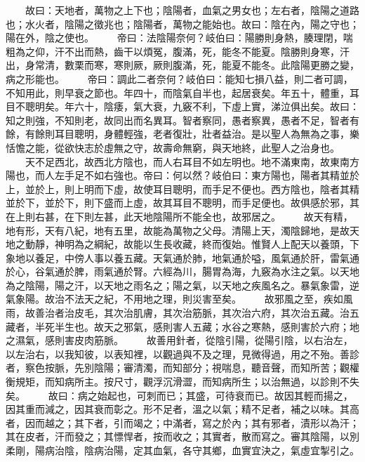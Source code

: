 \documentclass{ctexart}
\begin{document}
\begin{withgezhu}
　　故曰：天地者，萬物之上下也；陰陽者，血氣之男女也；左右者，陰陽之道路也；水火者，陰陽之徵兆也；陰陽者，萬物之能始也。故曰：陰在內，陽之守也；陽在外，陰之使也。
　　帝曰：法陰陽奈何？岐伯曰：陽勝則身熱，腠理閉，喘粗為之仰，汗不出而熱，齒干以煩冤，腹滿，死，能冬不能夏。陰勝則身寒，汗出，身常清，數栗而寒，寒則厥，厥則腹滿，死，能夏不能冬。此陰陽更勝之變，病之形能也。
　　帝曰：調此二者奈何？岐伯曰：能知七損八益，則二者可調，不知用此，則早衰之節也。年四十，而陰氣自半也，起居衰矣。年五十，體重，耳目不聰明矣。年六十，陰痿，氣大衰，九竅不利，下虛上實，涕泣俱出矣。故曰：知之則強，不知則老，故同出而名異耳。智者察同，愚者察異，愚者不足，智者有餘，有餘則耳目聰明，身體輕強，老者復壯，壯者益治。是以聖人為無為之事，樂恬憺之能，從欲快志於虛無之守，故壽命無窮，與天地終，此聖人之治身也。
　　天不足西北，故西北方陰也，而人右耳目不如左明也。地不滿東南，故東南方陽也，而人左手足不如右強也。帝曰：何以然？岐伯曰：東方陽也，陽者其精並於上，並於上，則上明而下虛，故使耳目聰明，而手足不便也。西方陰也，陰者其精並於下，並於下，則下盛而上虛，故其耳目不聰明，而手足便也。故俱感於邪，其在上則右甚，在下則左甚，此天地陰陽所不能全也，故邪居之。
　　故天有精，地有形，天有八紀，地有五里，故能為萬物之父母。清陽上天，濁陰歸地，是故天地之動靜，神明為之綱紀，故能以生長收藏，終而復始。惟賢人上配天以養頭，下象地以養足，中傍人事以養五藏。天氣通於肺，地氣通於嗌，風氣通於肝，雷氣通於心，谷氣通於脾，雨氣通於腎。六經為川，腸胃為海，九竅為水注之氣。以天地為之陰陽，陽之汗，以天地之雨名之；陽之氣，以天地之疾風名之。暴氣象雷，逆氣象陽。故治不法天之紀，不用地之理，則災害至矣。
　　故邪風之至，疾如風雨，故善治者治皮毛，其次治肌膚，其次治筋脈，其次治六府，其次治五藏。治五藏者，半死半生也。故天之邪氣，感則害人五藏；水谷之寒熱，感則害於六府；地之濕氣，感則害皮肉筋脈。
　　故善用針者，從陰引陽，從陽引陰，以右治左，以左治右，以我知彼，以表知裡，以觀過與不及之理，見微得過，用之不殆。善診者，察色按脈，先別陰陽；審清濁，而知部分；視喘息，聽音聲，而知所苦；觀權衡規矩，而知病所主。按尺寸，觀浮沉滑澀，而知病所生；以治無過，以診則不失矣。
　　故曰：病之始起也，可刺而已；其盛，可待衰而已。故因其輕而揚之，因其重而減之，因其衰而彰之。形不足者，溫之以氣；精不足者，補之以味。其高者，因而越之；其下者，引而竭之；中滿者，寫之於內；其有邪者，漬形以為汗；其在皮者，汗而發之；其慓悍者，按而收之；其實者，散而寫之。審其陰陽，以別柔剛，陽病治陰，陰病治陽，定其血氣，各守其鄉，血實宜決之，氣虛宜掣引之。

\end{withgezhu}


\end{document}
